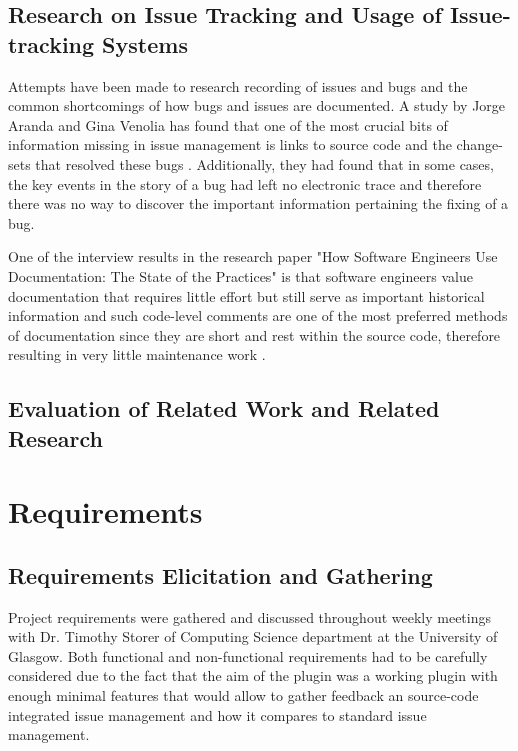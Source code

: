 \documentclass{4thYearProject}
\begin{document}
\section{Research on Issue Tracking and Usage of Issue-tracking Systems}\label{sec:Research}

Attempts have been made to research recording of issues and bugs and the common shortcomings of how bugs and issues are documented. A study by Jorge Aranda and Gina Venolia has found that one of the most crucial bits of information missing in issue management is links to source code and the change-sets that resolved these bugs \cite{lifeofbugs}. Additionally, they had found that in some cases, the key events in the story of a bug had left no electronic trace and therefore there was no way to discover the important information pertaining the fixing of a bug.

One of the interview results in the research paper "How Software Engineers Use Documentation: The State of the Practices" is that software engineers value documentation that requires little effort but still serve as important historical information and such code-level comments are one of the most preferred methods of documentation since they are short and rest within the source code, therefore resulting in very little maintenance work  \cite{stateofpractice}. 

\section{Evaluation of Related Work and Related Research}


\chapter{Requirements}

\section{Requirements Elicitation and Gathering}

Project requirements were gathered and discussed throughout weekly meetings with Dr. Timothy Storer of Computing Science department at the University of Glasgow. Both functional and non-functional requirements had to be carefully considered due to the fact that the aim of the plugin was a working plugin with enough minimal features that would allow to gather feedback an source-code integrated issue management and how it compares to standard issue management. 
\end{document}
